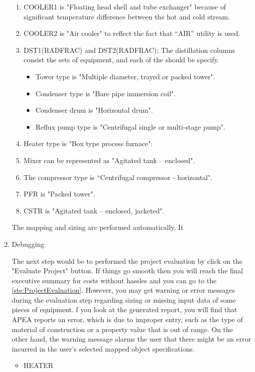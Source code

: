 \begin{enumerate}[label=\textbf{Step \arabic{enumi}}:,ref=Step \arabic{enumi}]
	\begin{enumerate}
		\item COOLER1 is "Floating head shell and tube exchanger" because of significant temperature difference between the hot and cold stream.
		\item COOLER2 is "Air cooler" to reflect the fact that “AIR” utility is used.
		\item DST1(RADFRAC) and DST2(RADFRAC); The distillation columns consist the sets of equipment, and each of the should be specify.
		\begin{itemize}
			\item Tower type is "Multiple diameter, trayed or packed tower".
			\item Condenser type is "Bare pipe immersion coil".
			\item Condenser drum is "Horizontal drum".
			\item Reflux pump type is "Centrifugal single or multi-stage pump".
		\end{itemize}
		\item Heater type is "Box type process furnace".
		\item Mixer can be represented as "Agitated tank – enclosed".
		\item The compressor type is “Centrifugal compressor - horizontal".
		\item PFR is "Packed tower".
		\item CSTR is "Agitated tank – enclosed, jacketed".
	\end{enumerate}

	The mapping and sizing are performed automatically. It 
	
	\item Debugging 
	
	The next step would be to performed the project evaluation by click on the "Evaluate Project" button. If things go smooth then you will reach the final executive summary for costs without hassles and you can go to the \ref{ste:ProjectEvaluation}. However, you may get warning or error messages during the evaluation step regarding sizing or missing input data of some pieces of equipment. f you look at the generated report, you will find that APEA reports an error, which is due	to improper entry, such as the type of material of construction or a property value that is out of range. On the other hand, the warning message alarms the user that there might be an error incurred in the user’s selected mapped object specifications.
	
	\begin{itemize}
		\item HEATER
		

\end{itemize}
\end{enumerate}
